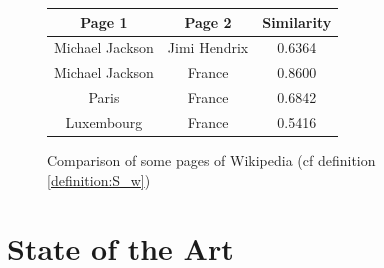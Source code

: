 \documentclass[11pt]{article}
\theoremstyle{plain}
\theoremstyle{definition}
\theoremstyle{remark}
\begin{document}
\begin{figure}
    \caption{Comparison of some pages of Wikipedia (cf definition \ref{definition:S_w})}
    \label{fig:similarity}
	\centering
	\begin{tabular}{c|c|c}
		Page 1			&	Page 2			&	Similarity \\
		\hline\hline
		Michael Jackson	&	Jimi Hendrix	&	0.6364	\\
		Michael Jackson	&	France			&	0.8600	\\
		Paris			&	France			&	0.6842	\\
		Luxembourg		&	France			&	0.5416	\\
  \end{tabular}
\end{figure}


\section{State of the Art}






\end{document}
